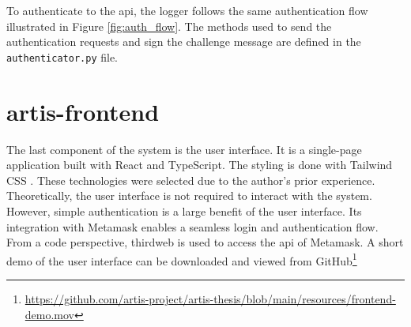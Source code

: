 To authenticate to the \gls{api}, the logger follows the same authentication flow illustrated in Figure \ref{fig:auth_flow}. The methods used to send the authentication requests and sign the challenge message are defined in the \texttt{authenticator.py} file.

\clearpage
\section{artis-frontend}
The last component of the system is the user interface. It is a single-page application built with React \cite{react} and TypeScript. The styling is done with Tailwind CSS \cite{tailwindcss}. These technologies were selected due to the author's prior experience. Theoretically, the user interface is not required to interact with the system. However, simple authentication is a large benefit of the user interface. Its integration with Metamask \cite{metamask} enables a seamless login and authentication flow. From a code perspective, thirdweb \cite{thirdweb} is used to access the \gls{api} of Metamask. A short demo of the user interface can be downloaded and viewed from GitHub\footnote{\href{https://github.com/artis-project/artis-thesis/blob/main/resources/frontend-demo.mov}{https://github.com/artis-project/artis-thesis/blob/main/resources/frontend-demo.mov}}

